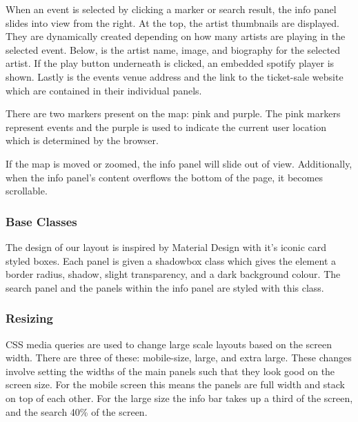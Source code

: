 \documentclass[10pt]{article}
\begin{document}
                When an event is selected by clicking a marker or search result, the info panel slides into view from the right. At the top, the artist thumbnails are displayed. They are dynamically created depending on how many artists are playing in the selected event. Below, is the artist name, image, and biography for the selected artist. If the play button underneath is clicked, an embedded spotify player is shown. Lastly is the events venue address and the link to the ticket-sale website which are contained in their individual panels.

                There are two markers present on the map: pink and purple. The pink markers represent events and the purple is used to indicate the current user location which is determined by the browser.

               If the map is moved or zoomed, the info panel will slide out of view. Additionally, when the info panel's content overflows the bottom of the page, it becomes scrollable.


            \subsubsection{Base Classes}
                The design of our layout is inspired by Material Design with it's iconic card styled boxes. Each panel is given a shadowbox class which gives the element a border radius, shadow, slight transparency, and a dark background colour. The search panel and the panels within the info panel are styled with this class.

            \subsubsection{Resizing}
                CSS media queries are used to change large scale layouts based on the screen width. There are three of these: mobile-size, large, and extra large. These changes involve setting the widths of the main panels such that they look good on the screen size. For the mobile screen this means the panels are full width and stack on top of each other. For the large size the info bar takes up a third of the screen, and the search 40\% of the screen.
\end{document}
